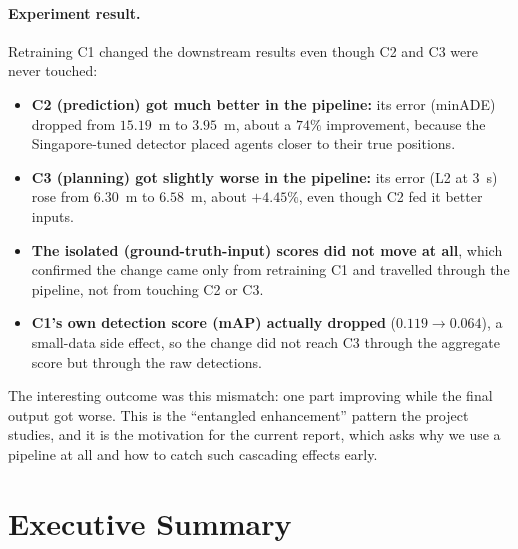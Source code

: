 \documentclass[11pt,a4paper]{article}
\begin{document}
\paragraph{Experiment result.} Retraining C1 changed the downstream results
even though C2 and C3 were never touched:
\begin{itemize}[noitemsep]
    \item \textbf{C2 (prediction) got much better in the pipeline:} its error
          (minADE) dropped from $15.19$~m to $3.95$~m, about a $74\%$
          improvement, because the Singapore-tuned detector placed agents
          closer to their true positions.
    \item \textbf{C3 (planning) got slightly worse in the pipeline:} its error
          (L2 at 3~s) rose from $6.30$~m to $6.58$~m, about $+4.45\%$, even
          though C2 fed it better inputs.
    \item \textbf{The isolated (ground-truth-input) scores did not move at
          all}, which confirmed the change came only from retraining C1 and
          travelled through the pipeline, not from touching C2 or C3.
    \item \textbf{C1's own detection score (mAP) actually dropped}
          ($0.119 \to 0.064$), a small-data side effect, so the change did not
          reach C3 through the aggregate score but through the raw detections.
\end{itemize}
The interesting outcome was this mismatch: one part improving while the final
output got worse. This is the ``entangled enhancement'' pattern the project
studies, and it is the motivation for the current report, which asks why we use
a pipeline at all and how to catch such cascading effects early.

\section{Executive Summary}
\end{document}
